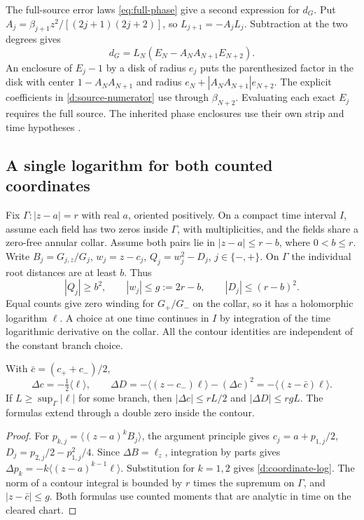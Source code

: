 The full-source error laws \eqref{eq:full-phase} give a second
expression for \(d_G\). Put
\(A_j=\beta_{j+1}z^2/[(2j+1)(2j+2)]\), so \(L_{j+1}=-A_jL_j\).
Subtraction at the two degrees gives
\begin{equation}
 d_G=L_N(E_N-A_NA_{N+1}E_{N+2}).
 \label{d:source-numerator}
\end{equation}
An enclosure of \(E_j-1\) by a disk of radius \(e_j\) puts the
parenthesized factor in the disk with center \(1-A_NA_{N+1}\) and
radius \(e_N+|A_NA_{N+1}|e_{N+2}\). The explicit coefficients in
\eqref{d:source-numerator} use through \(\beta_{N+2}\). Evaluating
each exact \(E_j\) requires the full source. The inherited phase
enclosures use their own strip and time hypotheses
\cite{vcd,jh03,jh04}.

\subsection{A single logarithm for both counted coordinates}

Fix \(\Gamma:|z-a|=r\) with real \(a\), oriented positively. On a
compact time interval \(I\), assume each field has two zeros inside
\(\Gamma\), with multiplicities, and the fields share a zero-free
annular collar. Assume both pairs lie in \(|z-a|\le r-b\), where
\(0<b\le r\). Write \(B_j=G_{j,z}/G_j\), \(w_j=z-c_j\),
\(Q_j=w_j^2-D_j\), \(j\in\{-,+\}\). On \(\Gamma\) the individual
root distances are at least \(b\). Thus
\[
 |Q_j|\ge b^2,\qquad |w_j|\le g:=2r-b,\qquad
 |D_j|\le (r-b)^2.
\]
Equal counts give zero winding for \(G_+/G_-\) on the collar, so it
has a holomorphic logarithm \(\ell\). A choice at one time continues
in \(I\) by integration of the time logarithmic derivative on the
collar. All the contour identities are independent of the constant
branch choice.

\begin{proposition}
\label{d:log-coordinates-prop}
With \(\bar c=(c_++c_-)/2\),
\begin{equation}
 \Delta c=-\tfrac12\langle\ell\rangle,\qquad
 \Delta D=-\langle(z-c_-)\ell\rangle-(\Delta c)^2
         =-\langle(z-\bar c)\ell\rangle.
 \label{d:coordinate-log}
\end{equation}
If \(L\ge\sup_\Gamma|\ell|\) for some branch, then
\(|\Delta c|\le rL/2\) and \(|\Delta D|\le rgL\).
The formulas extend through a double zero inside the contour.
\end{proposition}

\begin{proof}
For \(p_{k,j}=\langle(z-a)^kB_j\rangle\), the argument principle
gives \(c_j=a+p_{1,j}/2\), \(D_j=p_{2,j}/2-p_{1,j}^2/4\).
Since \(\Delta B=\ell_z\), integration by parts gives
\(\Delta p_k=-k\langle(z-a)^{k-1}\ell\rangle\). Substitution for
\(k=1,2\) gives \eqref{d:coordinate-log}. The norm of a contour
integral is bounded by \(r\) times the supremum on \(\Gamma\), and
\(|z-\bar c|\le g\). Both formulas use counted moments that are analytic
in time on the cleared chart.
\end{proof}

